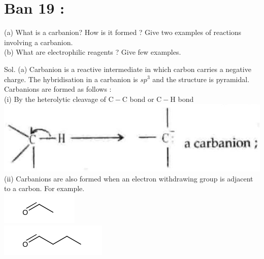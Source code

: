 \documentclass[10pt]{article}
\begin{document}
\section*{Ban 19 :}
(a) What is a carbanion? How is it formed ? Give two examples of reactions involving a carbanion.\\
(b) What are electrophilic reagents ? Give few examples.

Sol. (a) Carbanion is a reactive intermediate in which carbon carries a negative charge. The hybridisation in a carbanion is $s p^{3}$ and the structure is pyramidal.\\
Carbanions are formed as follows :\\
(i) By the heterolytic cleavage of $\mathrm{C}-\mathrm{C}$ bond or $\mathrm{C}-\mathrm{H}$ bond\\
\includegraphics[max width=\textwidth, center]{2025_01_28_8470952b98110cec3aabg-121}\\
(ii) Carbanions are also formed when an electron withdrawing group is adjacent to a carbon. For example.\\
\includegraphics{smile-628b7a3fe8175968e771e0a063a4415e3e3208a2}\\
\includegraphics{smile-bacb11482049b4ca4aa01cff67240c6f9ec2ac2d}
\end{document}
